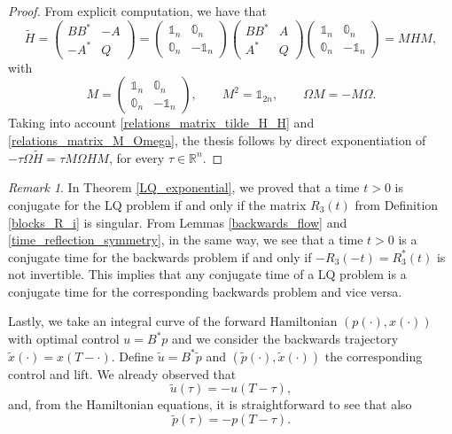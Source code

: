 \documentclass[reqno]{amsart}
\theoremstyle{plain}
\theoremstyle{definition}
\theoremstyle{remark}
\newtheorem{rem}[thm]{Remark}
\begin{document}
	\begin{proof}
		From explicit computation, we have that 
		\begin{equation}\label{relations_matrix_tilde_H_H}
		\tilde{H}=\begin{pmatrix}
			BB^* & -A\\
			-A^* & Q
		\end{pmatrix}= \begin{pmatrix}
			\mathbb{1}_n & \mathbb{0}_n\\
			\mathbb{0}_n & -\mathbb{1}_n
		\end{pmatrix}\begin{pmatrix}
			BB^* & A\\
			A^* & Q
		\end{pmatrix}\begin{pmatrix}
			\mathbb{1}_n & \mathbb{0}_n\\
			\mathbb{0}_n & -\mathbb{1}_n
		\end{pmatrix}=MHM,
		\end{equation}
		with 
		\begin{equation}\label{relations_matrix_M_Omega}
		M= \begin{pmatrix}
			\mathbb{1}_n & \mathbb{0}_n\\
			\mathbb{0}_n & -\mathbb{1}_n
		\end{pmatrix},\qquad M^2=\mathbb{1}_{2n},\qquad \Omega M=-M\Omega.
		\end{equation}
        Taking into account \eqref{relations_matrix_tilde_H_H} and \eqref{relations_matrix_M_Omega}, the thesis follows by direct exponentiation of $-\tau\Omega\tilde{H}=\tau M\Omega HM$, for every $\tau\in\mathbb{R}^n$.
	\end{proof}
    \begin{rem}\label{rmk_conj_times}
        In Theorem \ref{LQ_exponential}, we proved that a time $t>0$ is conjugate for the LQ problem if and only if the matrix $R_3(t)$ from Definition \ref{blocks_R_i} is singular.
       From Lemmas \ref{backwards_flow} and \ref{time_reflection_symmetry}, in the same way, we see that a time $t>0$ is a conjugate time for the backwards problem if and only if $-R_3(-t)=R_3^*(t)$ is not invertible. This implies that  any conjugate time of a LQ problem is a conjugate time for the corresponding backwards problem and vice versa.
       
	Lastly, we take an integral curve of the forward Hamiltonian $(p(\cdot),x(\cdot))$ with optimal control $u=B^*p$ and we consider the backwards trajectory $\tilde{x}(\cdot)=x(T-\cdot)$. Define $\tilde{u}=B^*\tilde{p}$ and $(\tilde{p}(\cdot),\tilde{x}(\cdot))$ the corresponding control and lift. We already observed that 
	\begin{equation}
		\tilde{u}(\tau)=-u(T-\tau),
	\end{equation}
	and, from the Hamiltonian equations, it is straightforward to see that also
	\begin{equation}
		\tilde{p}(\tau)=-p(T-\tau).
	\end{equation} 
    \end{rem}
\end{document}
